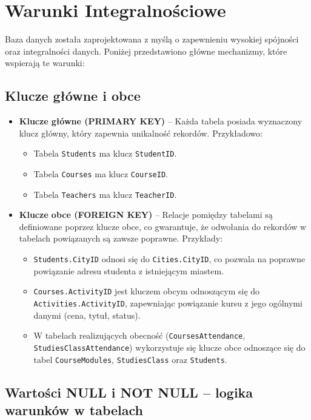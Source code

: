 \documentclass[12pt]{article}
\begin{document}
\newpage
\section{Warunki Integralnościowe}
\label{sec:integralnosc}

Baza danych została zaprojektowana z myślą o zapewnieniu wysokiej spójności oraz integralności danych. Poniżej przedstawiono główne mechanizmy, które wspierają te warunki:

\subsection{Klucze główne i obce}
\begin{itemize}
    \item \textbf{Klucze główne (PRIMARY KEY)} – Każda tabela posiada wyznaczony klucz główny, który zapewnia unikalność rekordów. Przykładowo:
        \begin{itemize}
            \item Tabela \texttt{Students} ma klucz \texttt{StudentID}.
            \item Tabela \texttt{Courses} ma klucz \texttt{CourseID}.
            \item Tabela \texttt{Teachers} ma klucz \texttt{TeacherID}.
        \end{itemize}
    \item \textbf{Klucze obce (FOREIGN KEY)} – Relacje pomiędzy tabelami są definiowane poprzez klucze obce, co gwarantuje, że odwołania do rekordów w tabelach powiązanych są zawsze poprawne. Przykłady:
        \begin{itemize}
            \item \texttt{Students.CityID} odnosi się do \texttt{Cities.CityID}, co pozwala na poprawne powiązanie adresu studenta z istniejącym miastem.
            \item \texttt{Courses.ActivityID} jest kluczem obcym odnoszącym się do \texttt{Activities.ActivityID}, zapewniając powiązanie kursu z jego ogólnymi danymi (cena, tytuł, status).
            \item W tabelach realizujących obecność (\texttt{CoursesAttendance}, \texttt{StudiesClassAttendance}) wykorzystuje się klucze obce odnoszące się do tabel \texttt{CourseModules}, \texttt{StudiesClass} oraz \texttt{Students}.
        \end{itemize}
\end{itemize}

\subsection{Wartości NULL i NOT NULL – logika warunków w tabelach}
\end{document}
